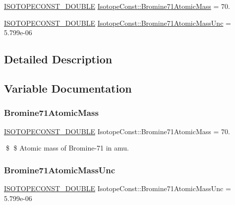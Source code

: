 \begin{DoxyCompactItemize}
\item 
\mbox{\hyperlink{group___isotope_const-_macros_ga8f45a7272ce02c0b4c65c44636ed719a}{I\+S\+O\+T\+O\+P\+E\+C\+O\+N\+S\+T\+\_\+\+D\+O\+U\+B\+LE}} \mbox{\hyperlink{group___isotope_const-_bromine-_br71_ga0db1cbc15ca99ebf7e6e0fffdf968697}{Isotope\+Const\+::\+Bromine71\+Atomic\+Mass}} = 70.
\item 
\mbox{\hyperlink{group___isotope_const-_macros_ga8f45a7272ce02c0b4c65c44636ed719a}{I\+S\+O\+T\+O\+P\+E\+C\+O\+N\+S\+T\+\_\+\+D\+O\+U\+B\+LE}} \mbox{\hyperlink{group___isotope_const-_bromine-_br71_gaa7f65fc3845ec6168a51852384c288ad}{Isotope\+Const\+::\+Bromine71\+Atomic\+Mass\+Unc}} = 5.\+799e-\/06
\end{DoxyCompactItemize}


\subsection{Detailed Description}


\subsection{Variable Documentation}
\mbox{\label{group___isotope_const-_bromine-_br71_ga0db1cbc15ca99ebf7e6e0fffdf968697}} 
\subsubsection{\texorpdfstring{Bromine71\+Atomic\+Mass}{Bromine71AtomicMass}}
{\footnotesize\ttfamily \mbox{\hyperlink{group___isotope_const-_macros_ga8f45a7272ce02c0b4c65c44636ed719a}{I\+S\+O\+T\+O\+P\+E\+C\+O\+N\+S\+T\+\_\+\+D\+O\+U\+B\+LE}} Isotope\+Const\+::\+Bromine71\+Atomic\+Mass = 70.}

\$ \$ Atomic mass of Bromine-\/71 in amu. \mbox{\label{group___isotope_const-_bromine-_br71_gaa7f65fc3845ec6168a51852384c288ad}} 
\subsubsection{\texorpdfstring{Bromine71\+Atomic\+Mass\+Unc}{Bromine71AtomicMassUnc}}
{\footnotesize\ttfamily \mbox{\hyperlink{group___isotope_const-_macros_ga8f45a7272ce02c0b4c65c44636ed719a}{I\+S\+O\+T\+O\+P\+E\+C\+O\+N\+S\+T\+\_\+\+D\+O\+U\+B\+LE}} Isotope\+Const\+::\+Bromine71\+Atomic\+Mass\+Unc = 5.\+799e-\/06}

